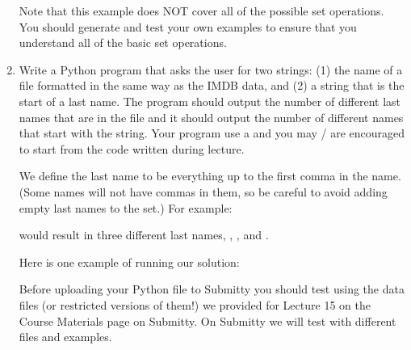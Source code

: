 \documentclass[letterpaper,10pt,english]{sphinxmanual}
\begin{document}
\begin{enumerate}
\begin{sphinxVerbatim}[commandchars=\\\{\}]
   
\end{sphinxVerbatim}

Note that this example does NOT cover all of the possible set
operations. You should generate and test your own examples to ensure
that you understand all of the basic set operations.

\item {} 
Write a Python program that asks the user for two strings:  (1) the
name of a file formatted in the same way as the IMDB data, and (2)
a string that is the start of a last name.  The program should
output the number of different last names that are in the file and
it should output the number of different names that start with the
string.  Your program  use a  and you may / are
encouraged to start from
the code written during lecture.

We define the last name to be everything up to the first comma in the
name.  (Some names will not have commas in them, so be careful to
avoid adding empty last names to the set.)   For example:

\begin{sphinxVerbatim}[commandchars=\\\{\}]
             
           
               
\end{sphinxVerbatim}

would result in three different last names, ,
, and .

Here is one example of running our solution:

\begin{sphinxVerbatim}[commandchars=\\\{\}]
   
 
  
   
\end{sphinxVerbatim}

Before uploading your Python file to Submitty you should test using
the data files (or restricted versions of them!)  we provided for
Lecture 15 on the Course Materials page on Submitty. On Submitty we will test with
different files and examples.

\end{enumerate}
\end{document}
